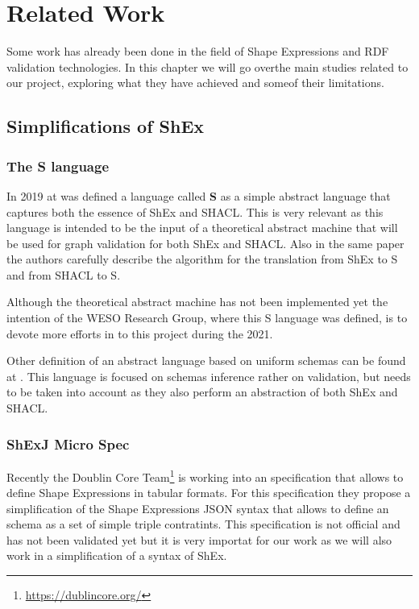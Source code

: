 \chapter{Related Work}
\label{ch:retalted-work}

Some work has already been done in the field of Shape Expressions and RDF validation
technologies. In this chapter we will go overthe main studies related to our project,
exploring what they have achieved and someof their limitations.


\section{Simplifications of ShEx}
\label{sec:related-work-simplifications}

\subsection{The \textbf{S} language}

In 2019 at \cite{rdf-challenges} was defined a language called \textbf{S} as a simple abstract
language that captures both the essence of ShEx and SHACL. This is very relevant as this language
is intended to be the input of a theoretical abstract machine that will be used for graph validation
for both ShEx and SHACL. Also in the same paper the authors carefully describe the algorithm for the
translation from ShEx to S and from SHACL to S.

Although the theoretical abstract machine has not been implemented yet the intention of the WESO
Research Group, where this S language was defined, is to devote more efforts in to this project
during the 2021.

Other definition of an abstract language based on uniform schemas can be found at \cite{iovka-auto-shex-shacl}.
This language is focused on schemas inference rather on validation, but needs to be taken
into account as they also perform an abstraction of both ShEx and SHACL.

\subsection{ShExJ Micro Spec}
Recently the Doublin Core Team\footnote{\url{https://dublincore.org/}} is working into an
specification that allows to define Shape Expressions in tabular formats. For this specification
they propose a simplification of the Shape Expressions JSON syntax that allows to define an
schema as a set of simple triple contratints. This specification is not official and has
not been validated yet but it is very importat for our work as we will also work in a
simplification of a syntax of ShEx.

